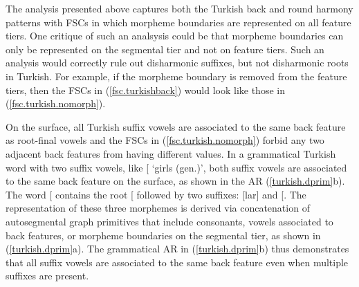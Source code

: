 \documentclass[,doc,floatsintext]{apa6}
\theoremstyle{definition}
\theoremstyle{definition}
\theoremstyle{definition}
\theoremstyle{remark}
\begin{document}
The analysis presented above captures both the Turkish back and round
harmony patterns with FSCs in which morpheme boundaries are represented
on all feature tiers. One critique of such an analsysis could be that
morpheme boundaries can only be represented on the segmental tier and
not on feature tiers. Such an analysis would correctly rule out
disharmonic suffixes, but not disharmonic roots in Turkish. For example,
if the morpheme boundary is removed from the feature tiers, then the
FSCs in (\ref{fsc.turkishback}) would look like those in
(\ref{fsc.turkish.nomorph}).

\begin{exe}
\ex \label{fsc.turkish.nomorph}
\end{exe}

On the surface, all Turkish suffix vowels are associated to the same
back feature as root-final vowels and the FSCs in
(\ref{fsc.turkish.nomorph}) forbid any two adjacent back features from
having different values. In a grammatical Turkish word with two suffix
vowels, like
{[}\textipa{\LARGE+}\textipa{1n}{]}
`girls (gen.)', both suffix vowels are associated to the same back
feature on the surface, as shown in the AR (\ref{turkish.dprim}b). The
word
{[}\textipa{\LARGE+}\textipa{1n}{]}
contains the root {[}\textipa{k1z}{]} followed by two suffixes:
{[}lar{]} and {[}\textipa{1n}{]}. The representation of these three
morphemes is derived via concatenation of autosegmental graph primitives
that include consonants, vowels associated to back features, or morpheme
boundaries on the segmental tier, as shown in (\ref{turkish.dprim}a).
The grammatical AR in (\ref{turkish.dprim}b) thus demonstrates that all
suffix vowels are associated to the same back feature even when multiple
suffixes are present.
\end{document}
